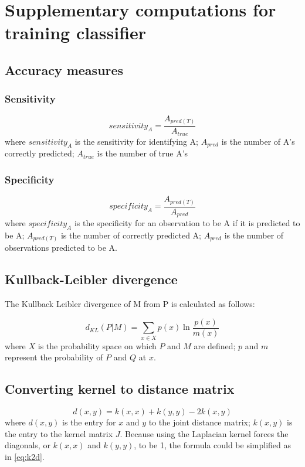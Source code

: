 \newpage
\section{Supplementary computations for training classifier}

\subsection{Accuracy measures}

\subsubsection{Sensitivity}
\begin{equation}
    sensitivity_A = \frac{A_{pred(T)}}{A_{true}} 
    \label{eq:sensitivity}
\end{equation}
where $sensitivity_A$ is the sensitivity for identifying A; $A_{pred}$ is the number of A's correctly predicted; $A_{true}$ is the number of true A's

\subsubsection{Specificity}
\begin{equation}
    specificity_A = \frac{A_{pred(T)}}{A_{pred}}
    \label{eq:specificity}
\end{equation}
where $specificity_A$ is the specificity for an observation to be A if it is predicted to be A; $A_{pred(T)}$ is the number of correctly predicted A; $A_{pred}$ is the number of observations predicted to be A.

\subsection{Kullback-Leibler divergence}
The Kullback Leibler divergence of M from P is calculated as follows:

\begin{equation}
    d_{KL}(P|M) = \sum_{x \in X} p(x) \ln{\frac{p(x)}{m(x)}}
    \label{eq:kl}
\end{equation}
where $X$ is the probability space on which $P$ and $M$ are defined; $p$ and $m$ represent the probability of $P$ and $Q$ at $x$.

\subsection{Converting kernel to distance matrix}

\begin{equation}
    d(x,y) = k(x,x) + k(y,y) - 2k(x,y) 
    \label{eq:k2d_ori}
\end{equation}
where $d(x,y)$ is the entry for $x$ and $y$ to the joint distance matrix; $k(x,y)$ is the entry to the kernel matrix $J$. Because using the Laplacian kernel forces the diagonals, or $k(x,x)$ and $k(y,y)$, to be 1, the formula could be simplified as in \ref{eq:k2d}.





